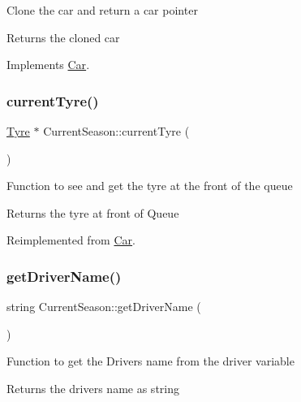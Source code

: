 Clone the car and return a car pointer \begin{DoxyReturn}{Returns}
the cloned car 
\end{DoxyReturn}


Implements \hyperlink{classCar_a5a54bbfe8e72022f4d9fdf6ecc990d99}{Car}.

\mbox{\label{classCurrentSeason_a9ea661b3a870ecb22026d9a3c7343a8f}} 
\subsubsection{\texorpdfstring{current\+Tyre()}{currentTyre()}}
{\footnotesize\ttfamily \hyperlink{classTyre}{Tyre} $\ast$ Current\+Season\+::current\+Tyre (\begin{DoxyParamCaption}{ }\end{DoxyParamCaption})\hspace{0.3cm}{\ttfamily [virtual]}}

Function to see and get the tyre at the front of the queue \begin{DoxyReturn}{Returns}
the tyre at front of Queue 
\end{DoxyReturn}


Reimplemented from \hyperlink{classCar_aadd6f69cf389b293a5e8a098ebc75f1d}{Car}.

\mbox{\label{classCurrentSeason_a3b8912ef6e838fe0a4d735ffc4cd7b66}} 
\subsubsection{\texorpdfstring{get\+Driver\+Name()}{getDriverName()}}
{\footnotesize\ttfamily string Current\+Season\+::get\+Driver\+Name (\begin{DoxyParamCaption}{ }\end{DoxyParamCaption})\hspace{0.3cm}{\ttfamily [virtual]}}

Function to get the Drivers name from the driver variable \begin{DoxyReturn}{Returns}
the drivers name as string 
\end{DoxyReturn}


